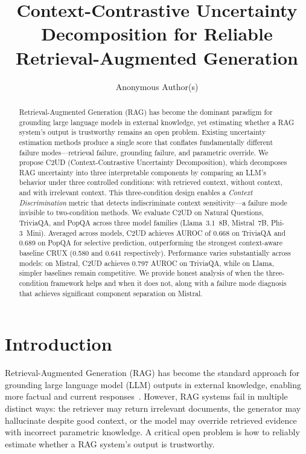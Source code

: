\documentclass{article}
\title{Context-Contrastive Uncertainty Decomposition for Reliable Retrieval-Augmented Generation}
\author{
  Anonymous Author(s)
}
\newcommand{\ours}{\textsc{C2UD}}
\begin{document}
\maketitle

\begin{abstract}
Retrieval-Augmented Generation (RAG) has become the dominant paradigm for grounding large language models in external knowledge, yet estimating whether a RAG system's output is trustworthy remains an open problem.
Existing uncertainty estimation methods produce a single score that conflates fundamentally different failure modes---retrieval failure, grounding failure, and parametric override.
We propose \ours{} (Context-Contrastive Uncertainty Decomposition), which decomposes RAG uncertainty into three interpretable components by comparing an LLM's behavior under three controlled conditions: with retrieved context, without context, and with irrelevant context.
This three-condition design enables a \emph{Context Discrimination} metric that detects indiscriminate context sensitivity---a failure mode invisible to two-condition methods.
We evaluate \ours{} on Natural Questions, TriviaQA, and PopQA across three model families (Llama~3.1~8B, Mistral~7B, Phi-3~Mini).
Averaged across models, \ours{} achieves AUROC of 0.668 on TriviaQA and 0.689 on PopQA for selective prediction, outperforming the strongest context-aware baseline CRUX (0.580 and 0.641 respectively).
Performance varies substantially across models: on Mistral, \ours{} achieves 0.797 AUROC on TriviaQA, while on Llama, simpler baselines remain competitive.
We provide honest analysis of when the three-condition framework helps and when it does not, along with a failure mode diagnosis that achieves significant component separation on Mistral.
\end{abstract}

\section{Introduction}

Retrieval-Augmented Generation (RAG) has become the standard approach for grounding large language model (LLM) outputs in external knowledge, enabling more factual and current responses~\citep{lewis2020rag}.
However, RAG systems fail in multiple distinct ways: the retriever may return irrelevant documents, the generator may hallucinate despite good context, or the model may override retrieved evidence with incorrect parametric knowledge.
A critical open problem is how to reliably estimate whether a RAG system's output is trustworthy.
\end{document}
